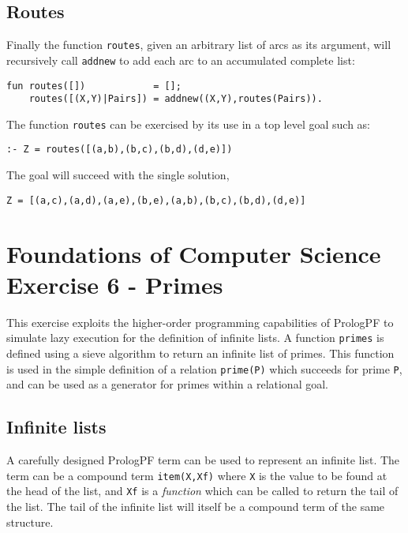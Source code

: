 \subsection{Routes}

Finally the function \texttt{routes}, given an arbitrary list of arcs as its argument,
will recursively call \texttt{addnew} to add each arc to an accumulated complete
list:
\begin{verbatim}
fun routes([])            = [];
    routes([(X,Y)|Pairs]) = addnew((X,Y),routes(Pairs)).
\end{verbatim}

The function \texttt{routes} can be exercised by its use in a top level goal such as:
\begin{verbatim}
:- Z = routes([(a,b),(b,c),(b,d),(d,e)])
\end{verbatim}
The goal will succeed with the single solution,\\
\centerline{\texttt{Z = [(a,c),(a,d),(a,e),(b,e),(a,b),(b,c),(b,d),(d,e)]}}

\section{Foundations of Computer Science Exercise 6 - Primes} %

This exercise exploits the higher-order programming capabilities of PrologPF to
simulate lazy execution for the definition of infinite lists.  A function
\texttt{primes} is defined using a sieve algorithm to return
an infinite list of primes.  This
function is used in the simple definition of a relation \texttt{prime(P)} which
succeeds for prime \texttt{P}, and can be used as a generator for primes within
a relational goal.

\subsection{Infinite lists}

A carefully designed PrologPF term can be used to represent an infinite list.  The
term can be a compound term \texttt{item(X,Xf)} where \texttt{X} is the value to be 
found at the
head of the list, and \texttt{Xf} is a \textit{function} which can be called to
return the tail of the list.  The tail of the infinite list will itself be a compound
term of the same structure.

